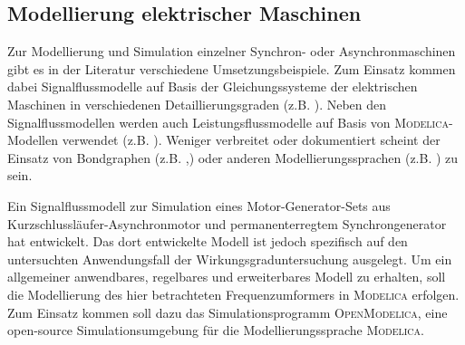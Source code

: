 \subsection{Modellierung elektrischer Maschinen}
\label{subsec:ModellierungElektrischerMaschinen}
Zur Modellierung und Simulation einzelner Synchron- oder Asynchronmaschinen gibt es in der Literatur verschiedene Umsetzungsbeispiele. Zum Einsatz kommen dabei Signalflussmodelle auf Basis der Gleichungssysteme der elektrischen Maschinen in verschiedenen Detaillierungsgraden (z.B. \cites{kutznerModellierungUndSimulation2010a,alibrahimSimulationsmodellDoppeltGespeisten2017,razakModellingSimulationElectric2021}). Neben den Signalflussmodellen werden auch Leistungsflussmodelle auf Basis von \textsc{Modelica}-Modellen verwendet (z.B. \cites{calisModelicaSimulationFeldorientiertGeregelten,frankeMultidisziplinareModellierungUnd2012,}). Weniger verbreitet oder dokumentiert scheint der Einsatz von Bondgraphen (z.B. \cite{sahmTwoaxisBondGraph1979},\cite[S.~269-321]{borutzkyBondGraphModelling2011}) oder anderen Modellierungssprachen (z.B. \cite{justusDynamischesVerhaltenElektrischer1993}) zu sein. 

Ein Signalflussmodell zur Simulation eines Motor-Generator-Sets aus Kurzschlussläufer-Asynchronmotor und permanenterregtem Synchrongenerator hat \cite{razakModellingSimulationElectric2021} entwickelt. Das dort entwickelte Modell ist jedoch spezifisch auf den untersuchten Anwendungsfall der Wirkungsgraduntersuchung ausgelegt. Um ein allgemeiner anwendbares, regelbares und erweiterbares Modell zu erhalten, soll die Modellierung des hier betrachteten Frequenzumformers in \textsc{Modelica} erfolgen. Zum Einsatz kommen soll dazu das Simulationsprogramm \textsc{OpenModelica}, eine open-source Simulationsumgebung für die Modellierungssprache \textsc{Modelica}.












